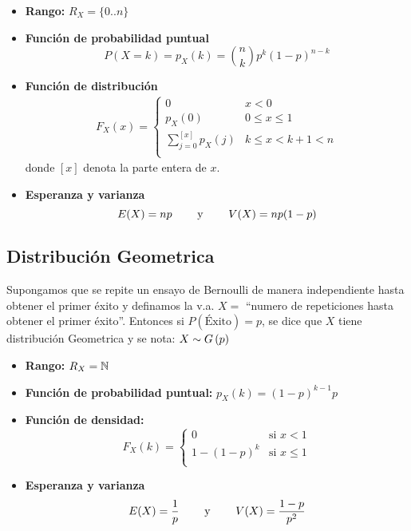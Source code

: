 \begin{itemize}
	\item \textbf{Rango:} $R_X = \{0 .. n\}$
    \item \textbf{Función de probabilidad puntual}$$P(X=k) = p_X(k)= \binom{n}{k}p^k(1-p)^{n-k}$$
   	\item \textbf{Función de distribución}
   	\begin{align*}
    F_X(x) = \left\{
	    \begin{array}{ll}
    		0 & x < 0 \\
    		p_X(0) & 0 \leq x \leq 1 \\
    		\sum_{j=0}^{[x]} p_X(j) & k \leq x < k+1 < n \\
    	\end{array}
    \right.
    \end{align*}
    donde $[x]$ denota la parte entera de $x$.
    \item \textbf{Esperanza y varianza}
    $$E(X) = np \hspace*{8mm}\text{y}\hspace*{8mm} V(X) = np(1-p)$$
\end{itemize}

\subsection{Distribución Geometrica}

Supongamos que se repite un ensayo de Bernoulli de manera independiente hasta obtener el primer éxito y definamos la v.a. $X=$ ``numero de repeticiones hasta obtener el primer éxito''. Entonces si $P(\text{Éxito}) = p$, se dice que $X$ tiene distribución Geometrica y se nota: $X\sim G\left(p\right)$

\begin{itemize}
\item \textbf{Rango:} $R_X = \mathbb{N}$
\item \textbf{Función de probabilidad puntual:} $p_X(k) = (1-p)^{k-1}p$
\item \textbf{Función de densidad:}$$F_X(k) =\left\{ \begin{array}{ll}
0 & \text{si } x < 1 \\
1 - (1-p)^k  & \text{si } x \leq 1\\
\end{array}\right. $$
\item \textbf{Esperanza y varianza}
$$E(X) = \frac{1}{p} \hspace*{8mm}\text{y}\hspace*{8mm} V(X) = \frac{1-p}{p^2}$$
\end{itemize}



